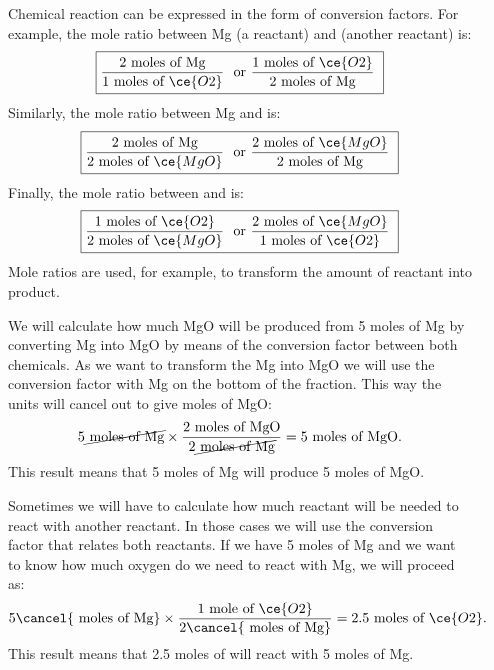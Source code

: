 \documentclass[main.tex]{subfiles}
\begin{document}
\begin{description}
\item[] 
Chemical reaction can be expressed in the form of conversion factors. 
For example, the mole ratio between Mg (a reactant) and  (another reactant) is:
\begin{equation*}
\boxed{   \frac{\text{2 moles of Mg}}{\text{1 moles of } \ce{O2}}\ \text{ or  } \frac{ \text{1 moles of } \ce{O2}}{ \text{2 moles of Mg}}\   }
\end{equation*}
Similarly, the mole ratio between Mg and  is:
\begin{equation*}
\boxed{   \frac{\text{2 moles of Mg}}{\text{2 moles of } \ce{MgO}}\ \text{ or  } \frac{ \text{2 moles of } \ce{MgO}}{ \text{2 moles of Mg}}\   }
\end{equation*}
Finally, the mole ratio between  and  is:
\begin{equation*}
\boxed{   \frac{\text{1 moles of }\ce{O2}}{\text{2 moles of } \ce{MgO}}\ \text{ or  } \frac{ \text{2 moles of } \ce{MgO}}{ \text{1 moles of }\ce{O2}}\   }
\end{equation*}
Mole ratios are used, for example, to transform the amount of reactant into product.
\item[] 
We will calculate how much MgO will be produced from 5 moles of Mg by converting Mg into MgO by means of the conversion factor between both chemicals. As we want to transform the Mg into MgO we will use the conversion factor with Mg on the bottom of the fraction. This way the units will cancel out to give moles of MgO:
 \begin{equation*}
5\cancel{\text{ moles of Mg}} \times \dfrac{\text{2 moles of MgO}}{2\cancel{\text{ moles of Mg}}}=5\text{ moles of MgO}.
\end{equation*}
This result means that 5 moles of Mg will produce 5 moles of MgO.

\item[] 
Sometimes we will have to calculate how much reactant will be needed to react with another reactant. In those cases we will use the conversion factor that relates both reactants. If we have 5 moles of Mg and we want to know how much oxygen do we need to react with Mg, we will proceed as:
\begin{equation*}
5\cancel{\text{ moles of Mg}} \times \dfrac{\text{1 mole of }\ce{O2}}{2\cancel{\text{ moles of Mg}}}=2.5\text{ moles of }\ce{O2}.
\end{equation*}
This result means that 2.5 moles of  will react with 5 moles of Mg.


\end{description}
\end{document}
